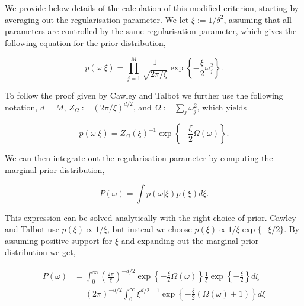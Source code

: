 \documentclass[11pt, oneside]{article}
\begin{document}
We provide below details of the calculation of this modified criterion, starting by averaging out the regularisation parameter.
We let $\xi := 1/\delta^2$, assuming that all parameters are controlled by the same regularisation parameter, which gives the following equation for the prior distribution,

\vspace{-0.5cm}
\begin{equation}
    p(\omega | \xi) = \prod_{j=1}^{M} \frac{1}{\sqrt{2\pi/\xi}}  \exp \left\{ -\frac{\xi}{2} \omega_j^2 \right\}.
\end{equation}

To follow the proof given by Cawley and Talbot we further use the following notation, $d = M$, $Z_\Omega := \left( 2\pi / \xi \right)^{d/2}$, and $\Omega := \sum_j \omega_j^2$, which yields

\vspace{-0.5cm}
\begin{equation}
    p(\omega | \xi) = {Z_\Omega(\xi)}^{-1}  \exp \left\{ -\frac{\xi}{2} \Omega(\omega)\right\}.
\end{equation}

We can then integrate out the regularisation parameter by computing the marginal prior distribution,

\vspace{-0.5cm}
\begin{equation}
    P(\omega) = \int p(\omega | \xi) p(\xi) d\xi.
\end{equation}

This expression can be solved analytically with the right choice of prior. 
Cawley and Talbot use $p(\xi) \propto 1/\xi$, but instead we choose $p(\xi) \propto 1/\xi \exp\{-\xi/2\}$.
By assuming positive support for $\xi$ and expanding out the marginal prior distribution we get,

\vspace{-0.5cm}
\begin{equation}
\begin{aligned}
    P(\omega) &= \int_0^{\infty} \left( \frac{2\pi}{\xi} \right)^{-d/2}  \exp \left\{ -\frac{\xi}{2} \Omega(\omega)\right\} \frac{1}{\xi} \exp\left\{-\frac{\xi}{2}\right\} d\xi\\
    &= (2\pi)^{-d/2} \int_0^{\infty} \xi^{d/2-1} \exp \left\{ -\frac{\xi}{2} \left(\Omega(\omega) + 1 \right) \right\} d\xi \\
\end{aligned}
\end{equation}
\end{document}
